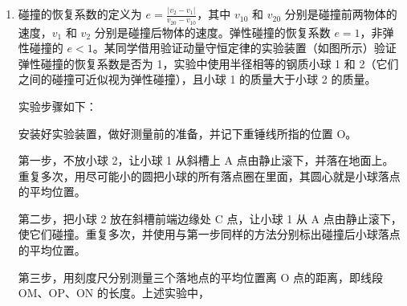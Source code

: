 \documentclass[\gkver]{gaokaozhenti}
\begin{document}
\begin{enumerate}
\begin{enumerate}



	\item
	碰撞的恢复系数的定义为 $e=\frac{|v_{2}-v_{1}|}{v_{20}-v_{10}}$，其中 $v_{10}$ 和 $v_{20}$ 分别是碰撞前两物体的速度，$v_{1}$ 和 $v_{2}$ 分别是碰撞后物体的速度。弹性碰撞的恢复系数 $e=1$，非弹性碰撞的 $e<1$。某同学借用验证动量守恒定律的实验装置（如图所示）验证弹性碰撞的恢复系数是否为 1，实验中使用半径相等的钢质小球 1 和 2（它们之间的碰撞可近似视为弹性碰撞），且小球 1 的质量大于小球 2 的质量。

	实验步骤如下：

	安装好实验装置，做好测量前的准备，并记下重锤线所指的位置 O。

	第一步，不放小球 2，让小球 1 从斜槽上 A 点由静止滚下，并落在地面上。重复多次，用尽可能小的圆把小球的所有落点圈在里面，其圆心就是小球落点的平均位置。

	第二步，把小球 2 放在斜槽前端边缘处 C 点，让小球 1 从 A 点由静止滚下，使它们碰撞。重复多次，并使用与第一步同样的方法分别标出碰撞后小球落点的平均位置。

	第三步，用刻度尺分别测量三个落地点的平均位置离 O 点的距离，即线段 OM、OP、ON 的长度。上述实验中，

\end{enumerate}
\end{enumerate}
\end{document}
